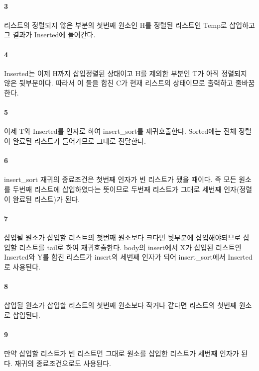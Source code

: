 \documentclass{oblivoir}
\begin{document}
\paragraph*{3}
리스트의 정렬되지 않은 부분의 첫번째 원소인 H를 정렬된 리스트인 Temp로 삽입하고 그 결과가 Inserted에 들어간다.

\paragraph*{4}
Inserted는 이제 H까지 삽입정렬된 상태이고 H를 제외한 부분인 T가 아직 정렬되지 않은 뒷부분이다. 따라서 이 둘을 합친 C가 현재 리스트의 상태이므로 출력하고 줄바꿈한다.

\paragraph*{5}
이제 T와 Inserted를 인자로 하여 insert\_sort를 재귀호출한다. Sorted에는 전체 정렬이 완료된 리스트가 들어가므로 그대로 전달한다.

\paragraph*{6}
insert\_sort 재귀의 종료조건은 첫번째 인자가 빈 리스트가 됐을 때이다. 즉 모든 원소를 두번째 리스트에 삽입하였다는 뜻이므로 두번째 리스트가 그대로 세번째 인자(정렬이 완료된 리스트)가 된다.

\paragraph*{7}
삽입될 원소가 삽입할 리스트의 첫번째 원소보다 크다면 뒷부분에 삽입해야되므로 삽입할 리스트를 tail로 하여 재귀호출한다. body의 insert에서 X가 삽입된 리스트인 Inserted와 Y를 합친 리스트가 insert의 세번째 인자가 되어 insert\_sort에서 Inserted로 사용된다.

\paragraph*{8}
삽입될 원소가 삽입할 리스트의 첫번째 원소보다 작거나 같다면 리스트의 첫번째 원소로 삽입된다.

\paragraph*{9}
만약 삽입할 리스트가 빈 리스트면 그대로 원소를 삽입한 리스트가 세번째 인자가 된다. 재귀의 종료조건으로도 사용된다.
\end{document}
